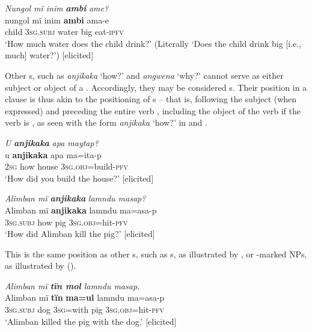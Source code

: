 \ea%
    \label{ex:syntax:19}
          \textit{Nungol mï inim} \textbf{\textit{ambi}} \textit{ame?}\\
\gll    nungol  mï      inim  \textbf{ambi}  ama-e\\
    child  \textsc{3sg.subj}  water  big    eat-\textsc{ipfv}\\
\glt `How much water does the child drink?’ (Literally ‘Does the child drink big [i.e., much] water?’) [elicited]
\z

Other s, such as \textit{anjikaka} ‘how?’ and \textit{angwena} ‘why?’ cannot serve as either subject or object of a . Accordingly, they may be considered s. Their position in a clause is thus akin to the positioning of s -- that is, following the subject (when expressed) and preceding the entire verb , including the object of the verb if the verb is , as seen with the form \textit{anjikaka} ‘how?’ in  and .

\ea%
    \label{ex:syntax:20}
          \textit{U} \textbf{\textit{anjikaka}} \textit{apa maytap?}\\
\gll    u    \textbf{anjikaka}  apa    ma=ita-p\\
    \textsc{2sg}  how    house  \textsc{3sg.obj=}build-\textsc{pfv}\\
\glt `How did you build the house?’ [elicited]
\z

\ea%
    \label{ex:syntax:21}
          \textit{Alimban mï} \textbf{\textit{anjikaka}} \textit{lamndu masap?}\\
\gll    Alimban  mï      \textbf{anjikaka}  lamndu  ma=asa-p\\
    [name]    \textsc{3sg.subj}  how    pig      \textsc{3sg.obj}=hit-\textsc{pfv}\\
\glt `How did Alimban kill the pig?’ [elicited]
\z

This is the same position as other s, such as s, as illustrated by , or -marked NPs, as illustrated by  ().

\ea%
    \label{ex:syntax:22}
          \textit{Alimban mï \textbf{tïn mol} lamndu masap.}\\
\gll    Alimban  mï      \textbf{tïn}    \textbf{ma=ul}    lamndu  ma=asa-p\\
    [name]    \textsc{3sg.subj}  dog  \textsc{3sg=}with  pig      \textsc{3sg.obj}=hit-\textsc{pfv}\\
\glt `Alimban killed the pig with the dog.’ [elicited]
\z

